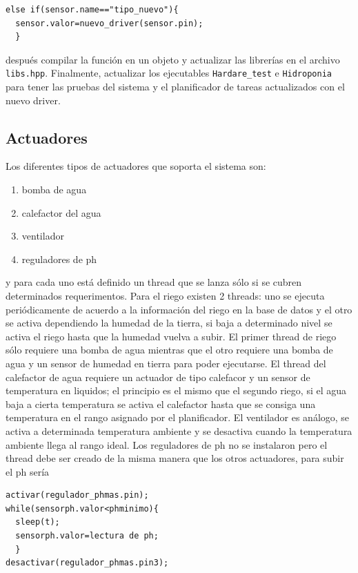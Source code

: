 \documentclass[10pt,twocolumn]{article}
\begin{document}
\begin{verbatim}
else if(sensor.name=="tipo_nuevo"){
  sensor.valor=nuevo_driver(sensor.pin);
  }
\end{verbatim}

despu\'es compilar la funci\'on en un objeto y actualizar las librer\'ias en el archivo \verb|libs.hpp|. Finalmente, actualizar los ejecutables \verb|Hardare_test| e 
\verb|Hidroponia| para tener las pruebas del sistema y el planificador de tareas actualizados con el nuevo driver.

\subsection{Actuadores}
Los diferentes tipos de actuadores que soporta el sistema son:
\begin{enumerate}
	\item bomba de agua
	\item calefactor del agua
	\item ventilador
	\item reguladores de ph
\end{enumerate}
y para cada uno est\'a definido un thread que se lanza s\'olo si se cubren determinados requerimentos. Para el riego existen 2 threads: uno se ejecuta 
peri\'odicamente 
de acuerdo a la informaci\'on del riego en la 
base de datos y el otro se activa dependiendo la humedad de la tierra, si baja a determinado nivel se activa el riego hasta que la humedad vuelva a subir. El primer thread 
de riego s\'olo 
requiere una bomba de agua mientras que el otro requiere una bomba de agua y un sensor de humedad en tierra para poder ejecutarse. El thread del calefactor de agua requiere 
un actuador de tipo calefacor y un sensor de temperatura en liquidos; el principio es el mismo que el segundo riego, si el agua baja a cierta temperatura se activa el 
calefactor 
hasta que se consiga una temperatura en el rango asignado por el planificador. El ventilador es an\'alogo, se activa a determinada temperatura ambiente y se desactiva 
cuando la temperatura ambiente llega al rango ideal. Los reguladores de ph no se instalaron pero el thread debe ser creado de la misma manera que los otros 
actuadores, para subir el ph ser\'ia

\begin{verbatim}
activar(regulador_phmas.pin);
while(sensorph.valor<phminimo){
  sleep(t);
  sensorph.valor=lectura de ph;
  }
desactivar(regulador_phmas.pin3);
\end{verbatim}
\end{document}
